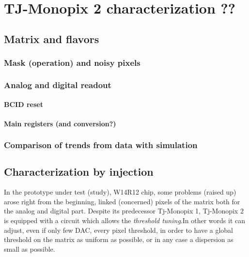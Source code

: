 
\chapter{TJ-Monopix 2 characterization ??}

\section{Matrix and flavors}

\subsection{Mask (operation) and noisy pixels}

\subsection{Analog and digital readout}

\subsubsection{BCID reset}
\begin{comment}
REFERENZE
\end{comment}

\subsubsection{Main registers (and conversion?)}

\subsection{Comparison of trends from data with simulation}


\section{Characterization by injection}

In the prototype under test (study), W14R12 chip, some problems (raised up) arose right from the beginning, linked (concerned) pixels of the matrix both for the analog and digital part.
Despite its predecessor Tj-Monopix 1, Tj-Monopix 2 is equipped with a circuit which allows the \textit{threshold tuning}.In other words it can adjust, even if only few DAC, every pixel threshold, in order to have a global threshold on the matrix as uniform as possible, or in any case a dispersion as small as possible.

